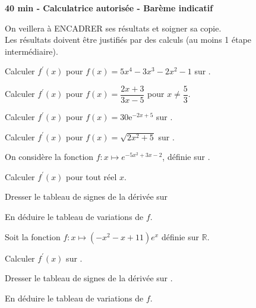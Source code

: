 \documentclass[11pt,a4paper]{article}  %
\begin{document}
	\graphicspath{{images/}}
	
	\begin{center}
		
	\end{center}
	\begin{center}\textbf{40 min - Calculatrice autorisée - Barème indicatif}\\
	\end{center}
	
	\begin{center}
		On veillera à ENCADRER ses résultats et soigner sa copie.\\
		Les résultats doivent être justifiés par des calculs (au moins 1 étape intermédiaire).
	\end{center}
	

\begin{enumMet}
	\item Calculer $f^{\prime}(x)$ pour $f(x)=5 x^4-3 x^3-2x^2-1$ sur \R. 
	\item Calculer $f^{\prime}(x)$ pour $f(x)=\dfrac{2x+3}{3x-5}$ pour $x \neq \dfrac{5}{3}$.
	\item Calculer $f^{\prime}(x)$ pour $f(x)=30 \mathrm{e}^{-2 x+5}$ sur \R. 
	\item Calculer $f^{\prime}(x)$ pour $f(x)=\sqrt{2x^2+5}$ sur \R.
\end{enumMet}


On considère la fonction $f: x \mapsto e^{-5 x^2+3 x-2}$, définie sur \R.
\begin{enumMet}
	\item Calculer $f^{\prime}(x)$ pour tout réel $x$.
	\item Dresser le tableau de signes de la dérivée sur \R
	\item En déduire le tableau de variations de $f$.
\end{enumMet}



Soit la fonction $f: x \mapsto\left(-x^2-x+11\right) e^x$ définie sur $\mathbb{R}$.

\begin{enumMet}
	\item Calculer $f^{\prime}(x)$ sur \R.
	\item Dresser le tableau de signes de la dérivée sur \R.
	\item En déduire le tableau de variations de $f$.
\end{enumMet}
\end{document}
